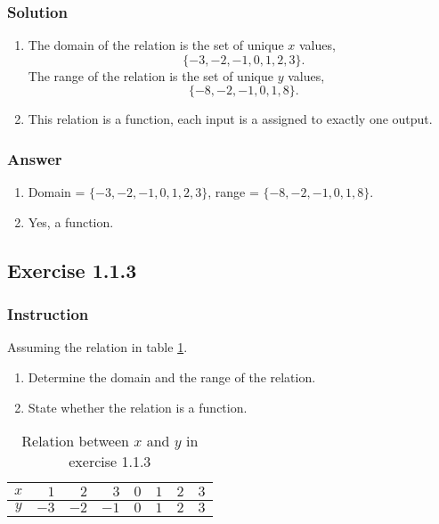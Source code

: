 \documentclass[11pt, letterpaper, oneside]{memoir}
\begin{document}
\subsubsection{Solution}

\begin{enumerate}[label=(\alph*)]
  \item The domain of the relation is the set of unique $ x $ values,
    $$ \phantom{.}
    \{ -3, -2, -1, 0, 1, 2, 3 \}
    .$$
    The range of the relation is the set of unique $ y $ values,
    $$ \phantom{.}
    \{ -8, -2, -1, 0, 1, 8\}
    .$$
  \item This relation is a function, each input is a assigned to exactly one output.
\end{enumerate}

\subsubsection{Answer}

\begin{enumerate}[label=(\alph*)]
  \item Domain = $ \{ -3, -2, -1, 0, 1, 2, 3 \} $, range = $ \{ -8, -2, -1, 0, 1, 8\} $.
  \item Yes, a function.
\end{enumerate}

\subsection*{Exercise 1.1.3}

\subsubsection{Instruction}

Assuming the relation in table \ref{table:exercise-1.1.3}.
\begin{enumerate}[label=(\alph*)]
  \item Determine the domain and the range of the relation.
  \item State whether the relation is a function.
\end{enumerate}

\begin{table}[ht]
  \centering
  \begin{tabular}{ c | r r r r r r r }
    \hline
    $ x $ & $ 1 $ & $ 2 $ & $ 3 $ & $ 0 $ & $ 1 $ & $ 2 $ & $ 3 $ \\
    \hline
    $ y $ & $ -3 $ & $ -2 $ & $ -1 $ & $ 0 $ & $ 1 $ & $ 2 $ & $ 3 $ \\
    \hline
  \end{tabular}
  \caption{Relation between $ x $ and $ y $ in exercise 1.1.3}
  \label{table:exercise-1.1.3}
\end{table}
\end{document}
